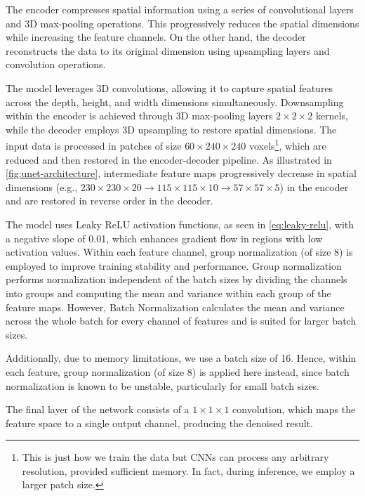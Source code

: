 The encoder compresses spatial information using a series of convolutional layers and 3D max-pooling operations. This progressively reduces the spatial dimensions while increasing the feature channels. On the other hand, the decoder reconstructs the data to its original dimension using upsampling layers and convolution operations. 

The model leverages 3D convolutions, allowing it to capture spatial features across the depth, height, and width dimensions simultaneously. Downsampling within the encoder is achieved through 3D max-pooling layers $2 \times 2 \times 2$ kernels, while the decoder employs 3D upsampling to restore spatial dimensions. The input data is processed in patches of size $60 \times 240 \times 240$ voxels\footnote{This is just how we train the data but \glspl{CNN} can process any arbitrary resolution, provided sufficient memory. In fact, during inference, we employ a larger patch size.}, which are reduced and then restored in the encoder-decoder pipeline. As illustrated in \cref{fig:unet-architecture}, intermediate feature maps progressively decrease in spatial dimensions (e.g., $230 \times 230 \times 20 \to 115 \times 115 \times 10 \to 57 \times 57 \times 5$) in the encoder and are restored in reverse order in the decoder.

The model uses Leaky ReLU activation functions, as seen in \cref{eq:leaky-relu}, with a negative slope of 0.01, which enhances gradient flow in regions with low activation values. Within each feature channel, group normalization (of size 8) is employed to improve training stability and performance. Group normalization performs normalization independent of the batch sizes by dividing the channels into groups and computing the mean and variance within each group of the feature maps\cite{wuGroupNormalization2018}. However, Batch Normalization calculates the mean and variance across the whole batch for every channel of features and is suited for larger batch sizes.

Additionally, due to memory limitations, we use a batch size of \num{16}. Hence, within each feature, group normalization (of size 8) is applied here instead, since batch normalization is known to be unstable, particularly for small batch sizes.

The final layer of the network consists of a $1 \times 1 \times 1$ convolution, which maps the feature space to a single output channel, producing the denoised result.


